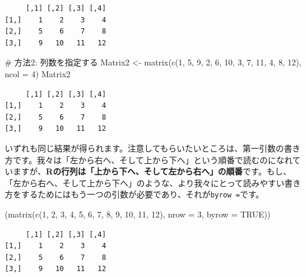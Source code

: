 \documentclass[
  a4paper,
  pandoc,
  ja=standard,
  jafont=haranoaji]{bxjsbook}
\newenvironment{Shaded}{\begin{snugshade}}{\end{snugshade}}
\newcommand{\AttributeTok}[1]{\textcolor[rgb]{0.00,0.48,0.65}{#1}}
\newcommand{\CommentTok}[1]{\textcolor[rgb]{0.37,0.37,0.37}{#1}}
\newcommand{\ConstantTok}[1]{\textcolor[rgb]{0.56,0.35,0.01}{#1}}
\newcommand{\DecValTok}[1]{\textcolor[rgb]{0.68,0.00,0.00}{#1}}
\newcommand{\FunctionTok}[1]{\textcolor[rgb]{0.28,0.35,0.67}{#1}}
\newcommand{\NormalTok}[1]{\textcolor[rgb]{0.00,0.48,0.65}{#1}}
\newcommand{\OtherTok}[1]{\textcolor[rgb]{0.00,0.48,0.65}{#1}}
\begin{document}
\begin{verbatim}
     [,1] [,2] [,3] [,4]
[1,]    1    2    3    4
[2,]    5    6    7    8
[3,]    9   10   11   12
\end{verbatim}

\begin{Shaded}
\begin{Highlighting}[numbers=left,,]
\CommentTok{\# 方法2: 列数を指定する}
\NormalTok{Matrix2 }\OtherTok{\textless{}{-}} \FunctionTok{matrix}\NormalTok{(}\FunctionTok{c}\NormalTok{(}\DecValTok{1}\NormalTok{, }\DecValTok{5}\NormalTok{, }\DecValTok{9}\NormalTok{, }\DecValTok{2}\NormalTok{, }\DecValTok{6}\NormalTok{, }\DecValTok{10}\NormalTok{, }\DecValTok{3}\NormalTok{, }\DecValTok{7}\NormalTok{, }\DecValTok{11}\NormalTok{, }\DecValTok{4}\NormalTok{, }\DecValTok{8}\NormalTok{, }\DecValTok{12}\NormalTok{), }\AttributeTok{ncol =} \DecValTok{4}\NormalTok{)}
\NormalTok{Matrix2}
\end{Highlighting}
\end{Shaded}

\begin{verbatim}
     [,1] [,2] [,3] [,4]
[1,]    1    2    3    4
[2,]    5    6    7    8
[3,]    9   10   11   12
\end{verbatim}

いずれも同じ結果が得られます。注意してもらいたいところは、第一引数の書き方です。我々は「左から右へ、そして上から下へ」という順番で読むのになれていますが、\textbf{Rの行列は「上から下へ、そして左から右へ」の順番}です。もし、「左から右へ、そして上から下へ」のような、より我々にとって読みやすい書き方をするためにはもう一つの引数が必要であり、それが\texttt{byrow\ =}です。

\begin{Shaded}
\begin{Highlighting}[numbers=left,,]
\NormalTok{(}\FunctionTok{matrix}\NormalTok{(}\FunctionTok{c}\NormalTok{(}\DecValTok{1}\NormalTok{, }\DecValTok{2}\NormalTok{, }\DecValTok{3}\NormalTok{, }\DecValTok{4}\NormalTok{, }\DecValTok{5}\NormalTok{, }\DecValTok{6}\NormalTok{, }\DecValTok{7}\NormalTok{, }\DecValTok{8}\NormalTok{, }\DecValTok{9}\NormalTok{, }\DecValTok{10}\NormalTok{, }\DecValTok{11}\NormalTok{, }\DecValTok{12}\NormalTok{), }\AttributeTok{nrow =} \DecValTok{3}\NormalTok{, }\AttributeTok{byrow =} \ConstantTok{TRUE}\NormalTok{))}
\end{Highlighting}
\end{Shaded}

\begin{verbatim}
     [,1] [,2] [,3] [,4]
[1,]    1    2    3    4
[2,]    5    6    7    8
[3,]    9   10   11   12
\end{verbatim}
\end{document}
